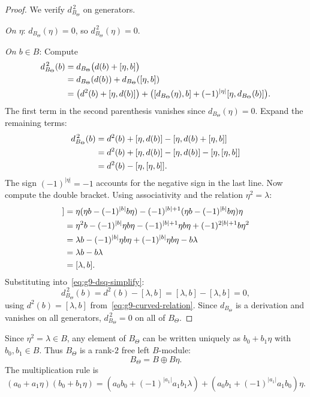 \begin{proof}
We verify $d_{B_\Theta}^{\,2}$ on generators.

\emph{On $\eta$}:
$d_{B_\Theta}(\eta) = 0$, so $d_{B_\Theta}^{\,2}(\eta) = 0$.

\emph{On $b \in B$}: Compute
\begin{align}
d_{B_\Theta}^{\,2}(b)
&= d_{B_\Theta}\bigl(d(b) + [\eta, b]\bigr) \notag \\
&= d_{B_\Theta}(d(b)) + d_{B_\Theta}([\eta, b]) \notag \\
&= \bigl(d^2(b) + [\eta, d(b)]\bigr)
 + \bigl([d_{B_\Theta}(\eta), b]
 + (-1)^{|\eta|}[\eta, d_{B_\Theta}(b)]\bigr). \label{eq:g9-dsq-expand}
\end{align}
The first term in the second parenthesis vanishes since
$d_{B_\Theta}(\eta) = 0$. Expand the remaining terms:
\begin{align}
d_{B_\Theta}^{\,2}(b)
&= d^2(b) + [\eta, d(b)]
 - [\eta, d(b) + [\eta, b]] \notag \\
&= d^2(b) + [\eta, d(b)]
 - [\eta, d(b)] - [\eta, [\eta, b]] \notag \\
&= d^2(b) - [\eta, [\eta, b]]. \label{eq:g9-dsq-simplify}
\end{align}
The sign $(-1)^{|\eta|} = -1$ accounts for the negative sign in the
last line. Now compute the double bracket.
Using associativity and the relation $\eta^2 = \lambda$:
\begin{align}
[\eta, [\eta, b]]
&= \eta(\eta b - (-1)^{|b|}b\eta)
 - (-1)^{|b|+1}(\eta b - (-1)^{|b|}b\eta)\eta \notag \\
&= \eta^2 b - (-1)^{|b|}\eta b \eta
 - (-1)^{|b|+1}\eta b \eta + (-1)^{2|b|+1}b\eta^2 \notag \\
&= \lambda b - (-1)^{|b|}\eta b \eta
 + (-1)^{|b|}\eta b \eta - b\lambda \notag \\
&= \lambda b - b \lambda \notag \\
&= [\lambda, b]. \label{eq:g9-bracket-curvature}
\end{align}
Substituting into~\eqref{eq:g9-dsq-simplify}:
\[
d_{B_\Theta}^{\,2}(b)
= d^2(b) - [\lambda, b]
= [\lambda, b] - [\lambda, b]
= 0,
\]
using $d^2(b) = [\lambda, b]$ from~\eqref{eq:g9-curved-relation}.
Since $d_{B_\Theta}$ is a derivation and vanishes on all
generators, $d_{B_\Theta}^{\,2} = 0$ on all of $B_\Theta$.
\end{proof}

\begin{remark}
\label{rem:g9-eta-filtration}
Since $\eta^2 = \lambda \in B$, any element of $B_\Theta$ can be
written uniquely as $b_0 + b_1 \eta$ with $b_0, b_1 \in B$.
Thus $B_\Theta$ is a rank-$2$ free left $B$-module:
\begin{equation}\label{eq:g9-BT-decomposition}
B_\Theta = B \oplus B\eta.
\end{equation}
The multiplication rule is
\begin{equation}\label{eq:g9-BT-multiplication}
(a_0 + a_1\eta)(b_0 + b_1\eta)
= (a_0 b_0 + (-1)^{|a_1|}a_1 b_1 \lambda)
 + (a_0 b_1 + (-1)^{|a_1|}a_1 b_0)\eta.
\end{equation}
\end{remark}

